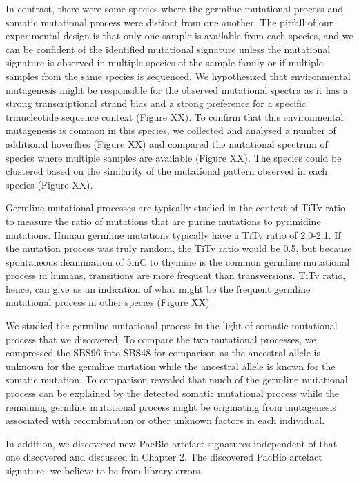In contrast, there were some species where the germline mutational process and somatic mutational process were distinct from one another. The pitfall of our experimental design is that only one sample is available from each species, and we can be confident of the identified mutational signature unless the mutational signature is observed in multiple species of the sample family or if multiple samples from the same species is sequenced. We hypothesized that environmental mutagenesis might be responsible for the observed mutational spectra as it has a strong transcriptional strand bias and a strong preference for a specific trinucleotide sequence context (Figure XX). To confirm that this environmental mutagenesis is common in this species, we collected and analysed a number of additional hoverflies (Figure XX) and compared the mutational spectrum of species where multiple samples are available (Figure XX). The species could be clustered based on the similarity of the mutational pattern observed in each species (Figure XX).

Germline mutational processes are typically studied in the context of TiTv ratio to measure the ratio of mutations that are purine mutations to pyrimidine mutations. Human germline mutations typically have a TiTv ratio of 2.0-2.1. If the mutation process was truly random, the TiTv ratio would be 0.5, but because spontaneous deamination of 5mC to thymine is the common germline mutational process in humans, transitions are more frequent than transversions. TiTv ratio, hence, can give us an indication of what might be the frequent germline mutational process in other species (Figure XX).

We studied the germline mutational process in the light of somatic mutational process that we discovered. To compare the two mutational processes, we compressed the SBS96 into SBS48 for comparison as the ancestral allele is unknown for the germline mutation while the ancestral allele is known for the somatic mutation. To comparison revealed that much of the germline mutational process can be explained by the detected somatic mutational process while the remaining germline mutational process might be originating from mutagenesis associated with recombination or other unknown factors in each individual. 

In addition, we discovered new PacBio artefact signatures independent of that one discovered and discussed in Chapter 2. The discovered PacBio artefact signature, we believe to be from library errors. 





